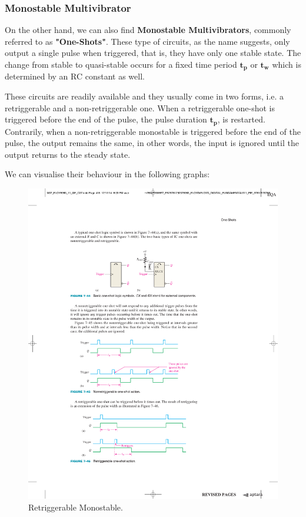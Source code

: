 \subsubsection{Monostable Multivibrator}

On the other hand, we can also find \textbf{Monostable Multivibrators}, commonly referred to as \textbf{"One-Shots"}. These type of circuits, as the name suggests, only output a single pulse when triggered, that is, they have only one stable state. The change from stable to quasi-stable occurs for a fixed time period $\mathbf{t_{p}}$ or $\mathbf{t_{w}}$ which is determined by an RC constant as well.\medskip

These circuits are readily available and they usually come in two forms, i.e. a retriggerable and a non-retriggerable one. When a retriggerable one-shot is triggered before the end of the pulse, the pulse duration $\mathbf{t_{p}}$, is restarted. Contrarily, when a non-retriggerable monostable is triggered before the end of the pulse, the output remains the same, in other words, the input is ignored until the output returns to the steady state.\medskip


\clearpage

We can visualise their behaviour in the following graphs:

\begin{figure}[H]
    \centering
    \includegraphics[scale = 1]{Graphics/VHDL/Practice 2/GRAPHICS/MONOSTABLE/RETRIGGERABLE.pdf}
    \caption{Retriggerable Monostable. ~\autocite{FLOYD}}
    \label{fig:RETRIGGERABLE}
\end{figure}

